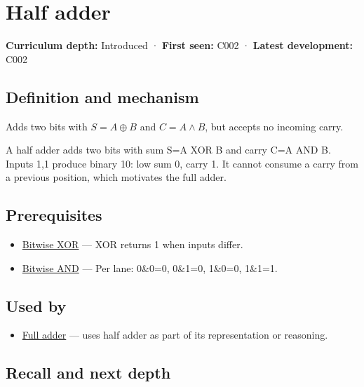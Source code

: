 \hypertarget{appendix-1652d27a8e90}{}
\section{Half adder}\label{appendix-1652d27a8e90-half-adder}

\textbf{Curriculum depth:} Introduced · \textbf{First seen:} C002 · \textbf{Latest development:} C002

\subsection{Definition and mechanism}\label{appendix-1652d27a8e90-definition-and-mechanism}

Adds two bits with \(S=A\oplus B\) and \(C=A\land B\), but accepts no incoming carry.

A half adder adds two bits with sum S=A XOR B and carry C=A AND B. Inputs 1,1 produce binary 10: low sum 0, carry 1. It cannot consume a carry from a previous position, which motivates the full adder.

\subsection{Prerequisites}\label{appendix-1652d27a8e90-prerequisites}

\begin{itemize}
\tightlist
\item
  \hyperref[appendix-d49161831368]{Bitwise XOR} --- XOR returns 1 when inputs differ.
\item
  \hyperref[appendix-68b52453737c]{Bitwise AND} --- Per lane: 0\&0=0, 0\&1=0, 1\&0=0, 1\&1=1.
\end{itemize}

\subsection{Used by}\label{appendix-1652d27a8e90-used-by}

\begin{itemize}
\tightlist
\item
  \hyperref[appendix-d1a5b1e520c2]{Full adder} --- uses half adder as part of its representation or reasoning.
\end{itemize}

\subsection{Recall and next depth}\label{appendix-1652d27a8e90-recall-and-next-depth}

